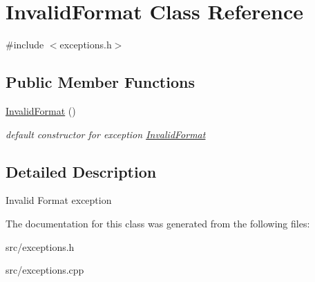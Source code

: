 \hypertarget{class_invalid_format}{}\section{Invalid\+Format Class Reference}
\label{class_invalid_format}


{\ttfamily \#include $<$exceptions.\+h$>$}

\subsection*{Public Member Functions}
\begin{DoxyCompactItemize}
\item 
\mbox{\label{class_invalid_format_a693f765dc9e6ea8a75bba3409c83d11a}} 
\mbox{\hyperlink{class_invalid_format_a693f765dc9e6ea8a75bba3409c83d11a}{Invalid\+Format}} ()
\begin{DoxyCompactList}\small\item\em default constructor for exception \mbox{\hyperlink{class_invalid_format}{Invalid\+Format}} \end{DoxyCompactList}\end{DoxyCompactItemize}


\subsection{Detailed Description}
Invalid Format exception 

The documentation for this class was generated from the following files\+:\begin{DoxyCompactItemize}
\item 
src/exceptions.\+h\item 
src/exceptions.\+cpp\end{DoxyCompactItemize}
